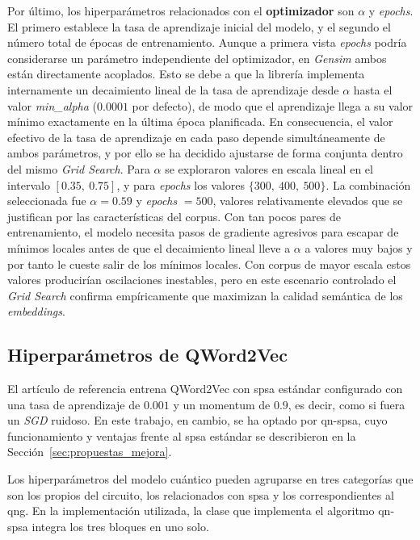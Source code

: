 Por último, los hiperparámetros relacionados con el \textbf{optimizador} son $\alpha$ y \textit{epochs}. El primero establece la tasa de aprendizaje inicial del modelo, y el segundo el número total de épocas de entrenamiento. Aunque a primera vista \textit{epochs} podría considerarse un parámetro independiente del optimizador, en \textit{Gensim} ambos están directamente acoplados. Esto se debe a que la librería implementa internamente un decaimiento lineal de la tasa de aprendizaje desde $\alpha$ hasta el valor \textit{min\_alpha} ($0.0001$ por defecto), de modo que el aprendizaje llega a su valor mínimo exactamente en la última época planificada. En consecuencia, el valor efectivo de la tasa de aprendizaje en cada paso depende simultáneamente de ambos parámetros, y por ello se ha decidido ajustarse de forma conjunta dentro del mismo \textit{Grid Search}. Para $\alpha$ se exploraron valores en escala lineal en el intervalo $[0.35,\ 0.75]$, y para \textit{epochs} los valores $\{300,\ 400,\ 500\}$. La combinación seleccionada fue $\alpha = 0.59$ y \textit{epochs} $= 500$, valores relativamente elevados que se justifican por las características del corpus. Con tan pocos pares de entrenamiento, el modelo necesita pasos de gradiente agresivos para escapar de mínimos locales antes de que el decaimiento lineal lleve a $\alpha$ a valores muy bajos y por tanto le cueste salir de los mínimos locales. Con corpus de mayor escala estos valores producirían oscilaciones inestables, pero en este escenario controlado el \textit{Grid Search} confirma empíricamente que maximizan la calidad semántica de los \textit{embeddings}.


\subsection{Hiperparámetros de QWord2Vec}

El artículo de referencia \cite{ohno_qword2vec_2025} entrena QWord2Vec con \gls{spsa} estándar configurado con una tasa de aprendizaje de $0.001$ y un momentum de $0.9$, es decir, como si fuera un \textit{SGD} ruidoso. En este trabajo, en cambio, se ha optado por \gls{qn-spsa}, cuyo funcionamiento y ventajas frente al \gls{spsa} estándar se describieron en la Sección~\ref{sec:propuestas_mejora}.

Los hiperparámetros del modelo cuántico pueden agruparse en tres categorías que son los propios del circuito, los relacionados con \gls{spsa} y los correspondientes al \gls{qng}. En la implementación utilizada, la clase que implementa el algoritmo \gls{qn-spsa} integra los tres bloques en uno solo.

